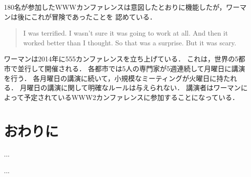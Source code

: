 \documentclass[submit,techreq,jkeyword,noauthor]{ipsj}
\begin{document}
180名が参加したWWWカンファレンスは意図したとおりに機能したが，ワーマンは後にこれが冒険であったことを
認めている．\cite{ek}

\begin{quote}
I was terrified. I wasn't sure it was going to work at all. And then it worked better 
than I thought. So that was a surprise. But it was scary.
\end{quote}


ワーマンは2014年に555カンファレンスを立ち上げている．
これは，世界の5都市で並行して開催される．
各都市では5人の専門家が5週連続して月曜日に講演を行う．
各月曜日の講演に続いて，小規模なミーティングが火曜日に持たれる．
月曜日の講演に関して明確なルールは与えられない．
講演者はワーマンによって予定されているWWW2カンファレンスに参加することになっている．\cite{ek}






\section{おわりに}

...

\begin{acknowledgment}
...
\end{acknowledgment}
\end{document}
